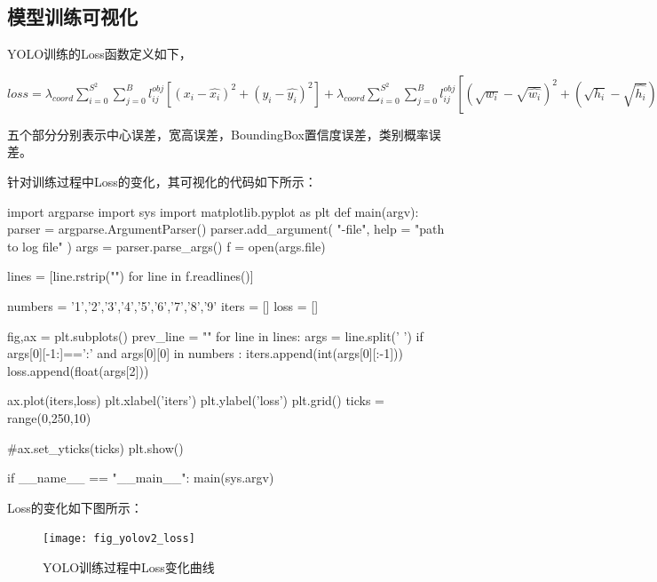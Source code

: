 \documentclass[a4paper, notitlepage]{article}
\begin{document}
\subsection{模型训练可视化}

YOLO训练的Loss函数定义如下，

\(
    loss=
    {\lambda}_{coord}\sum_{i=0}^{S^2}\sum_{j=0}^Bl_{ij}^{obj}[(x_i - \hat{x_i})^2+(y_i-\hat{y_i})^2] +
    {\lambda}_{coord}\sum_{i=0}^{S^2}\sum_{j=0}^Bl_{ij}^{obj}[(\sqrt{w_i}- \sqrt{\hat{w_i}})^2+(\sqrt{h_i}-\sqrt{\hat{h_i}})^2] +
    \sum_{i=0}^{S^2}\sum_{j=0}^B l_{ij}^{obj}(c_i - \hat{c_i})^2 +
    {\lambda}_{noobj}\sum_{i=0}^{S^2} \sum_{j=0}^B l_{ij}^{noobj}(c_i - \hat{c_i})^2 +
    \sum_{i=0}^{S^2}\sum_{c\in classes}(p_i(c)- \hat{p_i}(c))^2    
\)

五个部分分别表示中心误差，宽高误差，BoundingBox置信度误差，类别概率误差。

针对训练过程中Loss的变化，其可视化的代码如下所示：

\begin{python}
import argparse 
import sys
import matplotlib.pyplot as plt
def main(argv):
    parser = argparse.ArgumentParser()
    parser.add_argument(
        "-file",
        help = "path to log file"
        )
    args = parser.parse_args()
    f = open(args.file)
    
    lines  = [line.rstrip("\n") for line in f.readlines()]
    
    numbers = {'1','2','3','4','5','6','7','8','9'}
    iters = []
    loss = []
    
    fig,ax = plt.subplots()
    prev_line = ""
    for line in lines:
        args = line.split(' ')
        if args[0][-1:]==':' and args[0][0] in numbers :
            iters.append(int(args[0][:-1]))            
            loss.append(float(args[2]))
             
    ax.plot(iters,loss)
    plt.xlabel('iters')
    plt.ylabel('loss')
    plt.grid()
    ticks = range(0,250,10)
    
    #ax.set_yticks(ticks)
    plt.show()
    
if __name__ == "__main__":
    main(sys.argv)
\end{python}

Loss的变化如下图所示：

\begin{figure}[H]
    \centering
    \texttt{[image: fig\_yolov2\_loss]}
    \caption{YOLO训练过程中Loss变化曲线}
    \label{fig:example}
\end{figure}
\end{document}
